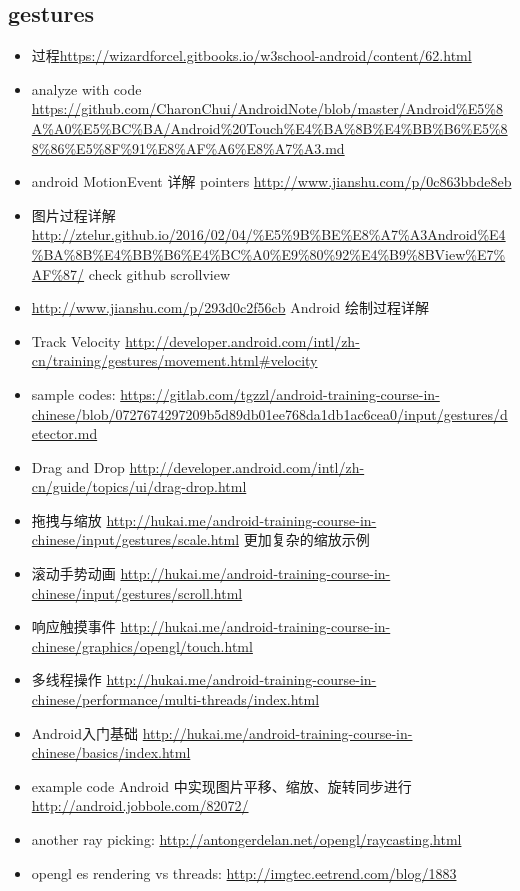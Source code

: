 \documentclass[9pt,b5paper]{article}
\begin{document}
\subsection{gestures}
\label{sec-2-2}
\begin{itemize}
\item 过程\url{https://wizardforcel.gitbooks.io/w3school-android/content/62.html}
\item analyze with code \url{https://github.com/CharonChui/AndroidNote/blob/master/Android\%E5\%8A\%A0\%E5\%BC\%BA/Android\%20Touch\%E4\%BA\%8B\%E4\%BB\%B6\%E5\%88\%86\%E5\%8F\%91\%E8\%AF\%A6\%E8\%A7\%A3.md}
\item android MotionEvent 详解 pointers \url{http://www.jianshu.com/p/0c863bbde8eb}
\item 图片过程详解\url{http://ztelur.github.io/2016/02/04/\%E5\%9B\%BE\%E8\%A7\%A3Android\%E4\%BA\%8B\%E4\%BB\%B6\%E4\%BC\%A0\%E9\%80\%92\%E4\%B9\%8BView\%E7\%AF\%87/} check github scrollview
\item \url{http://www.jianshu.com/p/293d0c2f56cb} Android 绘制过程详解
\item Track Velocity \url{http://developer.android.com/intl/zh-cn/training/gestures/movement.html#velocity}
\item sample codes: \url{https://gitlab.com/tgzzl/android-training-course-in-chinese/blob/0727674297209b5d89db01ee768da1db1ac6cea0/input/gestures/detector.md}
\item Drag and Drop \url{http://developer.android.com/intl/zh-cn/guide/topics/ui/drag-drop.html}
\item 拖拽与缩放 \url{http://hukai.me/android-training-course-in-chinese/input/gestures/scale.html} 更加复杂的缩放示例
\item 滚动手势动画 \url{http://hukai.me/android-training-course-in-chinese/input/gestures/scroll.html}
\item 响应触摸事件 \url{http://hukai.me/android-training-course-in-chinese/graphics/opengl/touch.html}
\item 多线程操作 \url{http://hukai.me/android-training-course-in-chinese/performance/multi-threads/index.html}
\item Android入门基础 \url{http://hukai.me/android-training-course-in-chinese/basics/index.html}
\item example code Android 中实现图片平移、缩放、旋转同步进行 \url{http://android.jobbole.com/82072/}
\item another ray picking: \url{http://antongerdelan.net/opengl/raycasting.html}
\item opengl es rendering vs threads: \url{http://imgtec.eetrend.com/blog/1883}

\end{itemize}
\end{document}
